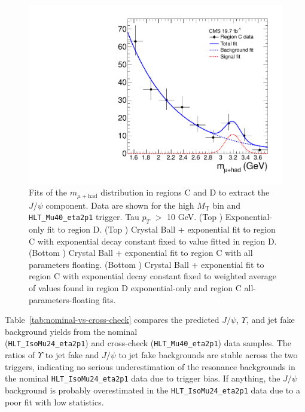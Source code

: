 \begin{figure}[hbtp]
\begin{center}
    \includegraphics[width=\cmsFigWidth]{figures/frame_muHadMass_m1p32052_0_0_weightedAvgkFixed_Mu40_eta2p1}
    \caption{Fits of the $m_{\mu+\text{had}}$ distribution in regions C and D to extract the $J\slash\psi$ component.  Data are shown for the high $M_{\text{T}}$ bin and \texttt{HLT\_Mu40\_eta2p1} trigger.   Tau $p_T$ $>$ 10 GeV.  (Top \cmsLeft) Exponential-only fit to region D.  (Top \cmsRight) Crystal Ball + exponential fit to region C with exponential decay constant fixed to value fitted in region D.  (Bottom \cmsLeft) Crystal Ball + exponential fit to region C with all parameters floating.  (Bottom \cmsRight) Crystal Ball + exponential fit to region C with exponential decay constant fixed to weighted average of values found in region D exponential-only and region C all-parameters-floating fits.}
    \label{fig:regC-regD-fit-Mu40}
  \end{center}
\end{figure}

Table~\ref{tab:nominal-vs-cross-check} compares the predicted $J\slash\psi$, $\Upsilon$, and jet fake background yields from the nominal \\(\texttt{HLT\_IsoMu24\_eta2p1}) and cross-check (\texttt{HLT\_Mu40\_eta2p1}) data samples.  The ratios of $\Upsilon$ to jet fake and $J\slash\psi$ to jet fake backgrounds are stable across the two triggers, indicating no serious underestimation of the resonance backgrounds in the nominal \texttt{HLT\_IsoMu24\_eta2p1} data due to trigger bias.  If anything, the $J\slash\psi$ background is probably overestimated in the \texttt{HLT\_IsoMu24\_eta2p1} data due to a poor fit with low statistics.


